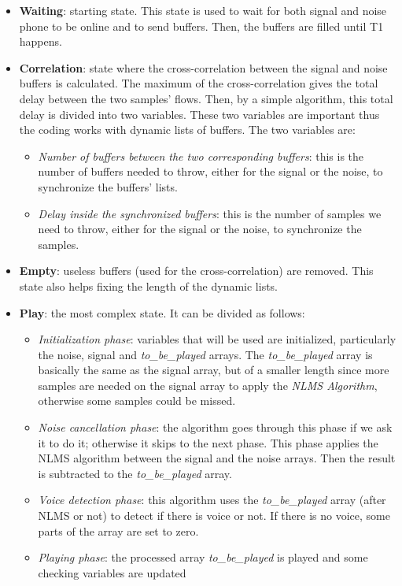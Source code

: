 \documentclass[11pt,a4paper,english]{book}  %
\theoremstyle{definition}  %
\theoremstyle{plain}  %
\theoremstyle{remark}  %
\begin{document}
	\begin{itemize}
	\item \textbf{Waiting}: starting state. This state is used to wait for both signal and noise phone to be online and to send buffers. Then, the buffers are filled until T1 happens.
	
	\item \textbf{Correlation}: state where the cross-correlation between the signal and noise buffers is calculated. The maximum of the cross-correlation gives the total delay between the two samples’ flows. Then, by a simple algorithm, this total delay is divided into two variables. These two variables are important thus the coding works with dynamic lists of buffers. The two variables are:
	
		\begin{itemize}
		\item \textit{Number of buffers between the two corresponding buffers}: this is the number of buffers needed to throw, either for the signal or the noise, to synchronize the buffers' lists.
		\item  \textit{Delay inside the synchronized buffers}: this is the number of samples we need to throw, either for the signal or the noise, to synchronize the samples.
		\end{itemize}
		
	\item \textbf{Empty}: useless buffers (used for the cross-correlation) are removed. This state also helps fixing the length of the dynamic lists.
	
	\item \textbf{Play}: the most complex state. It can be divided as follows:
	
		\begin{itemize}
		\item \textit{Initialization phase}: variables that will be used are initialized, particularly the noise, signal and \textit{to\_be\_played} arrays. The \textit{to\_be\_played} array is basically the same as the signal array,  but of a smaller length since more samples are needed on the signal array to apply the \textit{NLMS Algorithm}, otherwise some samples could be missed.
		
		\item \textit{Noise cancellation phase}: the algorithm goes through this phase if we ask it to do it; otherwise it skips to the next phase. This phase applies the NLMS algorithm between the signal and the noise arrays. Then the result is subtracted to the \textit{to\_be\_played} array.
		
		\item \textit{Voice detection phase}: this algorithm uses the \textit{to\_be\_played} array (after NLMS or not) to detect if there is voice or not. If there is no voice, some parts of the array are set to zero.
		\item \textit{Playing phase}: the processed array \textit{to\_be\_played} is played and some checking variables are updated
		\end{itemize}
		
		
	\end{itemize}
		
\end{document}
